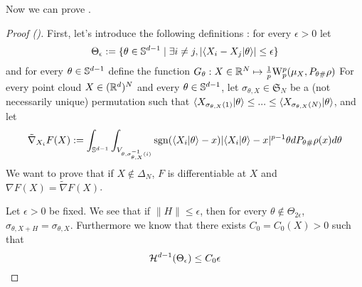 Now we can prove .
\begin{proof} [Proof ()]
    First, let's introduce the following definitions : for every $\epsilon > 0$ let 
    \begin{equation}
        \Theta_\epsilon := \{ \theta \in \mathbb{S}^{d-1} \mid \exists i \neq j, |\langle X_i-X_j|\theta\rangle| \leq \epsilon \}
    \end{equation}
    and for every $\theta \in \mathbb{S}^{d-1}$ define the function $G_\theta : X \in \mathbb R^N \mapsto \frac{1}{p} \mathrm{W}_p^p(\mu_X,P_{\theta\#}\rho)$
    For every point cloud $X \in (\mathbb R^d)^N$ and every $\theta \in \mathbb{S}^{d-1}$, let $\sigma_{\theta,X} \in \mathfrak{S}_N$ be a (not necessarily unique) permutation such that $\langle X_{\sigma_{\theta,X}(1)}|\theta\rangle \leq ... \leq \langle X_{\sigma_{\theta,X}(N)}|\theta\rangle$, and let 
    \begin{equation}
        \tilde{\nabla}_{X_i}F(X) := \int_{\mathbb S^{d-1}} \int_{V_{\theta,\sigma_{\theta,X}^{-1}(i)}} \mathrm{sgn}(\langle X_i|\theta\rangle - x)|\langle X_i|\theta\rangle - x|^{p-1}\theta dP_{\theta\#}\rho(x) d\theta
    \end{equation}
    We want to prove that if $X \notin \Delta_N$, $F$ is differentiable at $X$ and $\nabla F(X) = \tilde{\nabla}F(X)$.

    Let $\epsilon > 0$ be fixed. We see that if $\|H\| \leq \epsilon$, then for every $\theta \notin \Theta_{2\epsilon}$, $\sigma_{\theta,X+H} = \sigma_{\theta,X}$. Furthermore we know that there exists $C_0 = C_0(X) > 0$ such that
    \begin{equation}
        \mathcal{H}^{d-1}(\Theta_\epsilon) \leq C_0\epsilon
    \end{equation}


\end{proof}
